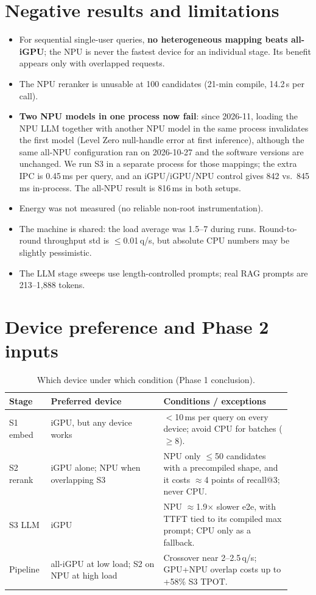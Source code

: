 \documentclass[10pt]{article}
\begin{document}
\section{Negative results and limitations}
\label{sec:neg}
\begin{itemize}
  \item For sequential single-user queries, \textbf{no heterogeneous mapping beats all-iGPU}; the NPU is never the
        fastest device for an individual stage. Its benefit appears only with overlapped requests.
  \item The NPU reranker is unusable at 100 candidates (21-min compile, 14.2\,s per call).
  \item \textbf{Two NPU models in one process now fail}: since 2026-11, loading the NPU LLM together with another NPU
        model in the same process invalidates the first model (Level Zero null-handle error at first inference),
        although the same all-NPU configuration ran on 2026-10-27 and the software versions are unchanged. We run S3 in
        a separate process for those mappings; the extra IPC is 0.45\,ms per query, and an iGPU/iGPU/NPU control gives
        842 vs.\ 845\,ms in-process. The all-NPU result is 816\,ms in both setups.
  \item Energy was not measured (no reliable non-root instrumentation).
  \item The machine is shared: the load average was 1.5--7 during runs. Round-to-round throughput std is
        $\le$0.01\,q/s, but absolute CPU numbers may be slightly pessimistic.
  \item The LLM stage sweeps use length-controlled prompts; real RAG prompts are 213--1{,}888 tokens.
\end{itemize}

\section{Device preference and Phase 2 inputs}

\begin{table}[h]
\centering\small
\caption{Which device under which condition (Phase 1 conclusion).}
\label{tab:prefer}
\begin{tabular}{p{0.13\linewidth}p{0.37\linewidth}p{0.42\linewidth}}
\toprule
Stage & Preferred device & Conditions / exceptions \\
\midrule
S1 embed & iGPU, but any device works & $<$10\,ms per query on every device; avoid CPU for batches ($\ge$8). \\
S2 rerank & iGPU alone; NPU when overlapping S3 & NPU only $\le$50 candidates with a precompiled shape, and it costs $\approx$4 points of recall@3; never CPU. \\
S3 LLM & iGPU & NPU $\approx$1.9$\times$ slower e2e, with TTFT tied to its compiled max prompt; CPU only as a fallback. \\
Pipeline & all-iGPU at low load; S2 on NPU at high load & Crossover near 2--2.5\,q/s; GPU+NPU overlap costs up to +58\% S3 TPOT. \\
\bottomrule
\end{tabular}
\end{table}
\end{document}
